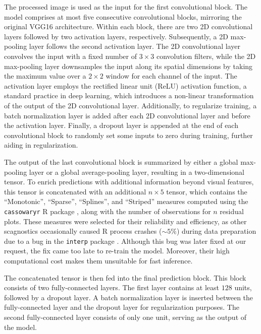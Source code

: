 \documentclass[]{interact}
\theoremstyle{plain}%
\theoremstyle{definition}
\theoremstyle{remark}
\begin{document}
The processed image is used as the input for the first convolutional
block. The model comprises at most five consecutive convolutional
blocks, mirroring the original VGG16 architecture. Within each block,
there are two 2D convolutional layers followed by two activation layers,
respectively. Subsequently, a 2D max-pooling layer follows the second
activation layer. The 2D convolutional layer convolves the input with a
fixed number of \(3 \times 3\) convolution filters, while the 2D
max-pooling layer downsamples the input along its spatial dimensions by
taking the maximum value over a \(2 \times 2\) window for each channel
of the input. The activation layer employs the rectified linear unit
(ReLU) activation function, a standard practice in deep learning, which
introduces a non-linear transformation of the output of the 2D
convolutional layer. Additionally, to regularize training, a batch
normalization layer is added after each 2D convolutional layer and
before the activation layer. Finally, a dropout layer is appended at the
end of each convolutional block to randomly set some inputs to zero
during training, further aiding in regularization.

The output of the last convolutional block is summarized by either a
global max-pooling layer or a global average-pooling layer, resulting in
a two-dimensional tensor. To enrich predictions with additional
information beyond visual features, this tensor is concatenated with an
additional \(n \times 5\) tensor, which contains the ``Monotonic'',
``Sparse'', ``Splines'', and ``Striped'' measures computed using the
\texttt{cassowaryr} R package \citep{mason2022cassowaryr} , along with
the number of observations for \(n\) residual plots. These measures were
selected for their reliability and efficiency, as other scagnostics
occasionally caused R process crashes (\(\sim 5\%\)) during data
preparation due to a bug in the \texttt{interp} package
\citep{Albrecht2023interp}. Although this bug was later fixed at our
request, the fix came too late to re-train the model. Moreover, their
high computational cost makes them unsuitable for fast inference.

The concatenated tensor is then fed into the final prediction block.
This block consists of two fully-connected layers. The first layer
contains at least \(128\) units, followed by a dropout layer. A batch
normalization layer is inserted between the fully-connected layer and
the dropout layer for regularization purposes. The second
fully-connected layer consists of only one unit, serving as the output
of the model.
\end{document}
